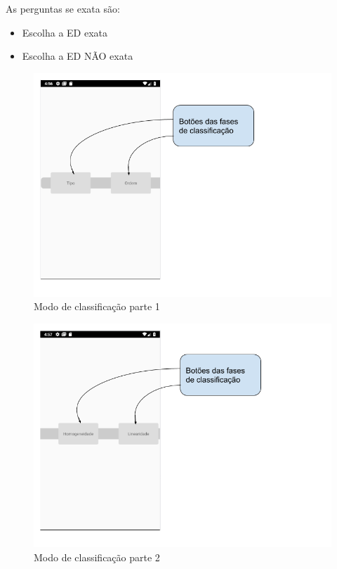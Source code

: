 As perguntas se exata são:
\begin{itemize}
	\item{}Escolha a ED exata
	\item{}Escolha a ED NÃO exata
\end{itemize} 

\begin{figure}[H]
\centering
\caption{Modo de classificação parte 1}
\includegraphics[scale=0.52]{figuras/modo_classificacao_1.png}
\end{figure}

\begin{figure}[H]
\centering
\caption{Modo de classificação parte 2}
\includegraphics[scale=0.52]{figuras/modo_classificacao_2.png}
\end{figure}

